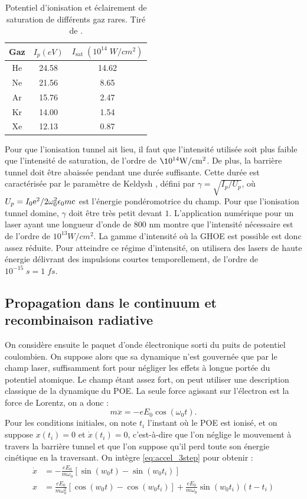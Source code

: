\begin{table}[h!]
\begin{tabular}{|c|c|c|}
  \hline
  Gaz & $I_p (\si{eV})$ & $I_{\text{sat}}\;(10^{14}\;\si{W/cm^2})$\\
  \hline
  He & 24.58 & 14.62 \\
  Ne & 21.56 & 8.65 \\
	Ar & 15.76 & 2.47 \\
	Kr & 14.00 & 1.54\\
	Xe & 12.13 & 0.87 \\
  \hline	
\end{tabular}
\centering
\caption{Potentiel d'ionisation et éclairement de saturation de différents gaz rares. Tiré de .}
\label{tab:Isat}
\end{table}
Pour que l'ionisation tunnel ait lieu, il faut que l'intensité utilisée soit plus faible que l'intensité de saturation, de l'ordre de $\10^{14}\si{W/cm^2}$. De plus, la barrière tunnel doit être abaissée pendant une durée suffisante. Cette durée est caractérisée par le paramètre de Keldysh , défini par $\gamma = \sqrt{I_p/U_p}$, où $U_p = I_0 \mathrm{e}^2/2\omega_0^2\epsilon_0 m \mathrm{c}$ est l'énergie pondéromotrice du champ. Pour que l'ionisation tunnel domine, $\gamma$ doit être très petit devant $1$. L'application numérique pour un laser ayant une longueur d'onde de 800 nm montre que l'intensité nécessaire est de l'ordre de ${10^{13}}\si{W/cm^2}$. La gamme d'intensité où la GHOE est possible est donc assez réduite. Pour atteindre ce régime d'intensité, on utilisera des lasers de haute énergie délivrant des impulsions courtes temporellement, de l'ordre de $10^{-15}\;s = 1\;fs$.

\subsection{Propagation dans le continuum et recombinaison radiative}
On considère ensuite le paquet d'onde électronique sorti du puits de potentiel coulombien. On suppose alors que sa dynamique n'est gouvernée que par le champ laser, suffisamment fort pour négliger les effets à longue portée du potentiel atomique. Le champ étant assez fort, on peut utiliser une description classique de la dynamique du POE. La seule force agissant sur l'électron est la force de Lorentz, on a donc :
\begin{equation}
m\ddot{x} = -eE_0 \cos(\omega_0 t).
\label{eq:accel_3step}
\end{equation}
Pour les conditions initiales, on note $t_i$ l'instant où le POE est ionisé, et on suppose $x(t_i) = 0$ et $\dot{x}(t_i) = 0$, c'est-à-dire que l'on néglige le mouvement à travers la barrière tunnel et que l'on suppose qu'il perd toute son énergie cinétique en la traversant. On intègre \ref{eq:accel_3step} pour obtenir :
\begin{align}
\dot{x}&=-\frac{eE_0}{m\omega_0} [\sin{(w_0t)}-\sin{(w_0t_i)}]\\
x&=\frac{eE_0}{m\omega_0^2} [\cos{(w_0t)}-\cos{(w_0t_i)}]+\frac{eE_0}{m\omega_0}\sin{(w_0t_i)}(t-t_i)
\label{eq:pos_3step}
\end{align}

